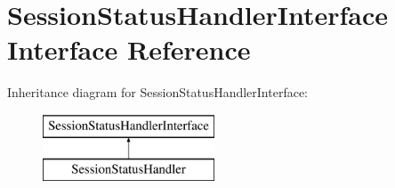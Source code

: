 \hypertarget{interface_pes_1_1_session_1_1_session_status_handler_interface}{}\section{Session\+Status\+Handler\+Interface Interface Reference}
\label{interface_pes_1_1_session_1_1_session_status_handler_interface}
Inheritance diagram for Session\+Status\+Handler\+Interface\+:\begin{figure}[H]
\begin{center}
\leavevmode
\includegraphics[height=2.000000cm]{interface_pes_1_1_session_1_1_session_status_handler_interface}
\end{center}
\end{figure}
